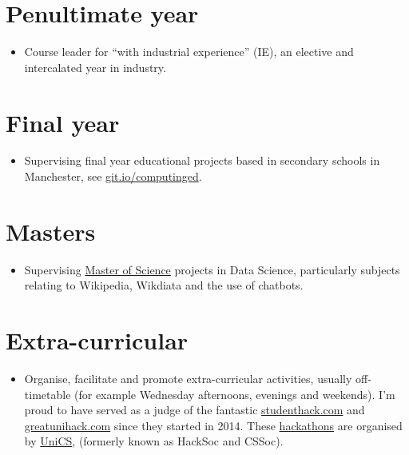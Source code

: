 \documentclass[12pt,]{book}
\providecommand{\tightlist}{%
  \setlength{\itemsep}{0pt}\setlength{\parskip}{0pt}}
\begin{document}
\hypertarget{penultimate-year}{%
\section{Penultimate year}\label{penultimate-year}}

\begin{itemize}
\tightlist
\item
  Course leader for ``with industrial experience'' (IE), an elective and intercalated year in industry.
\end{itemize}

\hypertarget{final-year}{%
\section{Final year}\label{final-year}}

\begin{itemize}
\tightlist
\item
  Supervising final year educational projects based in secondary schools in Manchester, see \href{https://git.io/computinged}{git.io/computinged}.
\end{itemize}

\hypertarget{masters}{%
\section{Masters}\label{masters}}

\begin{itemize}
\tightlist
\item
  Supervising \href{https://www.cs.manchester.ac.uk/study/masters/}{Master of Science} projects in Data Science, particularly subjects relating to Wikipedia, Wikdiata and the use of chatbots.
\end{itemize}

\hypertarget{extra-curricular}{%
\section{Extra-curricular}\label{extra-curricular}}

\begin{itemize}
\tightlist
\item
  Organise, facilitate and promote extra-curricular activities, usually off-timetable (for example Wednesday afternoons, evenings and weekends). I'm proud to have served as a judge of the fantastic \href{https://www.studenthack.com}{studenthack.com} and \href{https://greatunihack.com}{greatunihack.com} since they started in 2014. These \href{https://medium.com/tfogo/hackathons-are-for-beginners-77a9c9c0e000}{hackathons} are organised by \href{https://www.unicsmcr.com/}{UniCS}, (formerly known as HackSoc and CSSoc).
\end{itemize}
\end{document}
